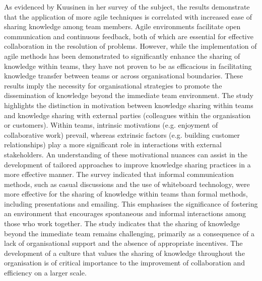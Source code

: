 As evidenced by Kuusinen \cite{Kuusinen2017} in her survey of the subject, the results demonstrate that the application of more agile techniques is correlated with increased ease of sharing knowledge among team members. Agile environments facilitate open communication and continuous feedback, both of which are essential for effective collaboration in the resolution of problems. However, while the implementation of agile methods has been demonstrated to significantly enhance the sharing of knowledge within teams, they have not proven to be as efficacious in facilitating knowledge transfer between teams or across organisational boundaries. These results imply the necessity for organisational strategies to promote the dissemination of knowledge beyond the immediate team environment. The study highlights the distinction in motivation between knowledge sharing within teams and knowledge sharing with external parties (colleagues within the organisation or customers). Within teams, intrinsic motivations (e.g. enjoyment of collaborative work) prevail, whereas extrinsic factors (e.g. building customer relationships) play a more significant role in interactions with external stakeholders. An understanding of these motivational nuances can assist in the development of tailored approaches to improve knowledge sharing practices in a more effective manner. The survey indicated that informal communication methods, such as casual discussions and the use of whiteboard technology, were more effective for the sharing of knowledge within teams than formal methods, including presentations and emailing. This emphasises the significance of fostering an environment that encourages spontaneous and informal interactions among those who work together. The study indicates that the sharing of knowledge beyond the immediate team remains challenging, primarily as a consequence of a lack of organisational support and the absence of appropriate incentives. The development of a culture that values the sharing of knowledge throughout the organisation is of critical importance to the improvement of collaboration and efficiency on a larger scale.